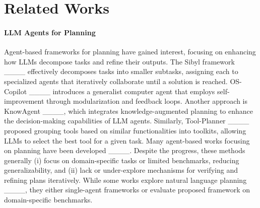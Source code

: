 \section{Related Works}
\label{sec:related_works}

\paragraph{LLM Agents for Planning}

Agent-based frameworks for planning have gained interest, focusing on enhancing how LLMs decompose tasks and refine their outputs. The Sibyl framework ____ effectively decomposes tasks into smaller subtasks, assigning each to specialized agents that iteratively collaborate until a solution is reached. OS-Copilot ____ introduces a generalist computer agent that employs self-improvement through modularization and feedback loops. Another approach is KnowAgent ____, which integrates knowledge-augmented planning to enhance the decision-making capabilities of LLM agents. Similarly, Tool-Planner ____ proposed grouping tools based on similar functionalities into toolkits, allowing LLMs to select the best tool for a given task. Many agent-based works focusing on planning have been developed ____. Despite the progress, these methods generally (i) focus on domain-specific tasks or limited benchmarks, reducing generalizability, and (ii) lack or under-explore mechanisms for verifying and refining plans iteratively. While some works explore natural language planning ____, they either single-agent frameworks or evaluate proposed framework on domain-specific benchmarks.  



